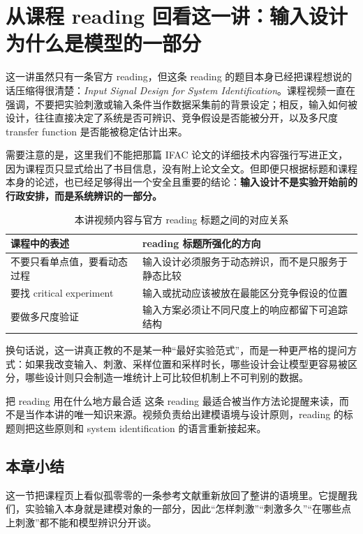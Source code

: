 \documentclass[a4paper]{article}
\begin{document}
\section{从课程 reading 回看这一讲：输入设计为什么是模型的一部分}
这一讲虽然只有一条官方 reading，但这条 reading 的题目本身已经把课程想说的话压缩得很清楚：\emph{Input Signal Design for System Identification}。课程视频一直在强调，不要把实验刺激或输入条件当作数据采集前的背景设定；相反，输入如何被设计，往往直接决定了系统是否可辨识、竞争假设是否能被分开，以及多尺度 transfer function 是否能被稳定估计出来。

需要注意的是，这里我们不能把那篇 IFAC 论文的详细技术内容强行写进正文，因为课程页只显式给出了书目信息，没有附上论文全文。但即便只根据标题和课程本身的论述，也已经足够得出一个安全且重要的结论：\textbf{输入设计不是实验开始前的行政安排，而是系统辨识的一部分。}

\begin{table}[H]
\centering
\caption{本讲视频内容与官方 reading 标题之间的对应关系}
\begin{tabular}{p{}p{}}
\toprule
课程中的表述 & reading 标题所强化的方向 \\
\midrule
不要只看单点值，要看动态过程 & 输入设计必须服务于动态辨识，而不是只服务于静态比较 \\
要找 critical experiment & 输入或扰动应该被放在最能区分竞争假设的位置 \\
要做多尺度验证 & 输入方案必须让不同尺度上的响应都留下可追踪结构 \\
\bottomrule
\end{tabular}
\end{table}

换句话说，这一讲真正教的不是某一种“最好实验范式”，而是一种更严格的提问方式：如果我改变输入、刺激、采样位置和采样时长，哪些设计会让模型更容易被区分，哪些设计则只会制造一堆统计上可比较但机制上不可判别的数据。

\begin{knowledgebox}{把 reading 用在什么地方最合适}
这条 reading 最适合被当作方法论提醒来读，而不是当作本讲的唯一知识来源。视频负责给出建模语境与设计原则，reading 的标题则把这些原则和 system identification 的语言重新接起来。
\end{knowledgebox}

\subsection{本章小结}
这一节把课程页上看似孤零零的一条参考文献重新放回了整讲的语境里。它提醒我们，实验输入本身就是建模对象的一部分，因此“怎样刺激”“刺激多久”“在哪些点上刺激”都不能和模型辨识分开谈。
\end{document}
